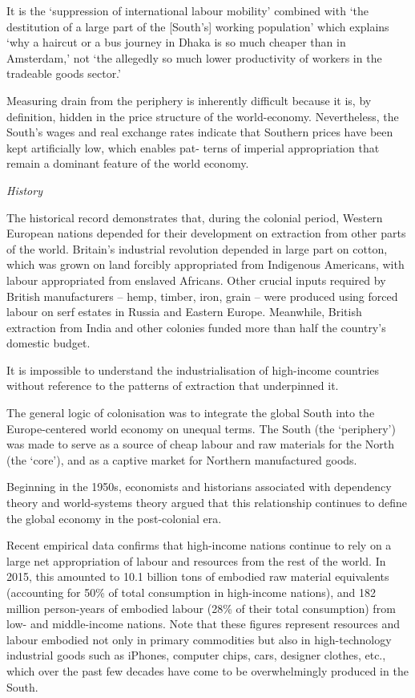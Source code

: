 \documentclass[
]{book}
\begin{document}
It is the `suppression of international labour mobility' combined
with `the destitution of a large part of the {[}South's{]}
working population' which explains `why a haircut or a bus journey in Dhaka is so much cheaper
than in Amsterdam,' not `the allegedly so much lower productivity of workers in the tradeable
goods sector.'

Measuring drain from the periphery is inherently difficult because it is,
by definition, hidden in the price structure of the world-economy. Nevertheless, the South's wages and
real exchange rates indicate that Southern prices have been kept artificially low, which enables pat-
terns of imperial appropriation that remain a dominant feature of the world economy.

\emph{History}

The historical record demonstrates that, during the colonial period,
Western European nations depended for their development on extraction
from other parts of the world.
Britain's industrial revolution depended in large part on cotton,
which was grown on land forcibly appropriated from Indigenous Americans,
with labour appropriated from enslaved Africans.
Other crucial inputs required by British manufacturers -- hemp, timber, iron, grain --
were produced using forced labour on serf estates in Russia and Eastern Europe.
Meanwhile, British extraction from India and other colonies funded
more than half the country's domestic budget.

It is impossible to understand the industrialisation of high-income countries
without reference to the patterns of extraction that underpinned it.

The general logic of colonisation was to integrate the global South
into the Europe-centered world economy on unequal terms.
The South (the `periphery') was made to serve as a source of
cheap labour and raw materials for the North (the `core'),
and as a captive market for Northern manufactured goods.

Beginning in the 1950s, economists and historians associated with dependency theory
and world-systems theory argued that this relationship continues to
define the global economy in the post-colonial era.

Recent empirical data confirms that high-income nations continue to rely on
a large net appropriation of labour and resources from the rest of the world.
In 2015, this amounted to 10.1 billion tons of embodied raw material equivalents
(accounting for 50\% of total consumption in high-income nations),
and 182 million person-years of embodied labour (28\% of their total consumption)
from low- and middle-income nations.
Note that these figures represent resources and labour embodied not only
in primary commodities but also in high-technology industrial goods
such as iPhones, computer chips, cars, designer clothes, etc.,
which over the past few decades have come to be overwhelmingly produced
in the South.
\end{document}
